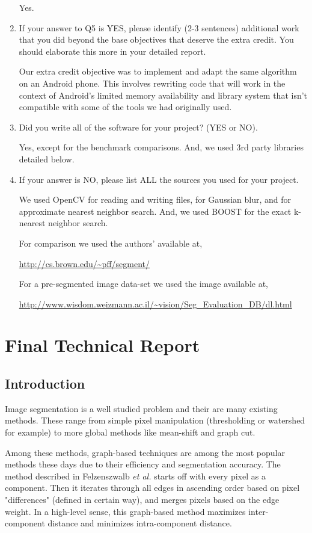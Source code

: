\documentclass[12pt, english, titlepage]{article}
\begin{document}
\begin{enumerate}
Yes.

\item If your answer to Q5 is YES, please identify (2-3 sentences) additional work that you did beyond the base objectives that deserve the extra credit. You should elaborate this more in your detailed report.

Our extra credit objective was to implement and adapt the same algorithm on an Android phone. This involves rewriting code that will work in the context of Android's limited memory availability and library system that isn't compatible with some of the tools we had originally used.

\item Did you write all of the software for your project? (YES or NO).

Yes, except for the benchmark comparisons. And, we used 3rd party libraries detailed below.

\item If your answer is NO, please list ALL the sources you used for your project.

We used OpenCV for reading and writing files, for Gaussian blur, and for approximate nearest neighbor search. And, we used BOOST for the exact k-nearest neighbor search.

For comparison we used the authors' available at,

\url{http://cs.brown.edu/~pff/segment/}

For a pre-segmented image data-set we used the image available at,

\url{http://www.wisdom.weizmann.ac.il/~vision/Seg_Evaluation_DB/dl.html}

\end{enumerate}


\section{Final Technical Report}

\subsection{Introduction}

Image segmentation is a well studied problem and their are many existing methods. These range from simple pixel manipulation (thresholding or watershed for example) to more global methods like mean-shift and graph cut.

Among these methods, graph-based techniques are among the most popular methods these days due to their efficiency and segmentation accuracy. The method described in Felzenszwalb \emph{et al.} \cite{paper} starts off with every pixel as a component. Then it iterates through all edges in ascending order based on pixel "differences" (defined in certain way), and merges pixels based on the edge weight. In a high-level sense, this graph-based method maximizes inter-component distance and minimizes intra-component distance.
	
\end{document}
